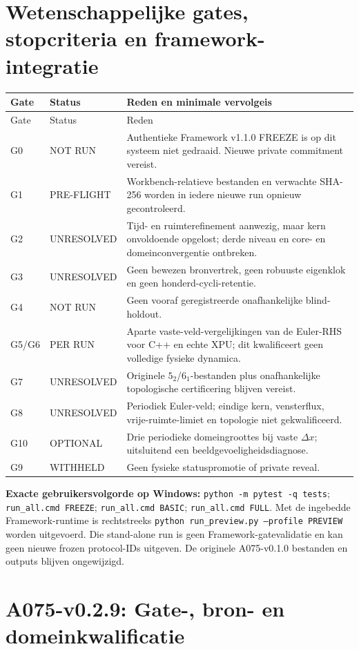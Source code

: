 \documentclass[10pt,a4paper]{article}
\begin{document}
\section{Wetenschappelijke gates, stopcriteria en framework-integratie}
\begin{longtable}{@{}p{12mm}p{25mm}p{109mm}@{}}\toprule
Gate & Status & Reden en minimale vervolgeis\\\midrule\endfirsthead\toprule Gate & Status & Reden\\\midrule\endhead
G0 & NOT RUN & Authentieke Framework v1.1.0 FREEZE is op dit systeem niet gedraaid. Nieuwe private commitment vereist.\\
G1 & PRE-FLIGHT & Workbench-relatieve bestanden en verwachte SHA-256 worden in iedere nieuwe run opnieuw gecontroleerd.\\
G2 & UNRESOLVED & Tijd- en ruimterefinement aanwezig, maar kern onvoldoende opgelost; derde niveau en core- en domeinconvergentie ontbreken.\\
G3 & UNRESOLVED & Geen bewezen bronvertrek, geen robuuste eigenklok en geen honderd-cycli-retentie.\\
G4 & NOT RUN & Geen vooraf geregistreerde onafhankelijke blind-holdout.\\
G5/G6 & PER RUN & Aparte vaste-veld-vergelijkingen van de Euler-RHS voor C++ en echte XPU; dit kwalificeert geen volledige fysieke dynamica.\\
G7 & UNRESOLVED & Originele $5_2$/$6_1$-bestanden plus onafhankelijke topologische certificering blijven vereist.\\
G8 & UNRESOLVED & Periodiek Euler-veld; eindige kern, vensterflux, vrije-ruimte-limiet en topologie niet gekwalificeerd.\\
G10 & OPTIONAL & Drie periodieke domeingroottes bij vaste $\Delta x$; uitsluitend een beeldgevoeligheidsdiagnose.\\
G9 & WITHHELD & Geen fysieke statuspromotie of private reveal.\\\bottomrule\end{longtable}
\noindent\textbf{Exacte gebruikersvolgorde op Windows:} \texttt{python -m pytest -q tests}; \texttt{run\_all.cmd FREEZE}; \texttt{run\_all.cmd BASIC}; \texttt{run\_all.cmd FULL}. Met de ingebedde Framework-runtime is rechtstreeks \texttt{python run\_preview.py --profile PREVIEW} worden uitgevoerd. Die stand-alone run is geen Framework-gatevalidatie en kan geen nieuwe frozen protocol-IDs uitgeven. De originele A075-v0.1.0 bestanden en outputs blijven ongewijzigd.
\section{A075-v0.2.9: Gate-, bron- en domeinkwalificatie}
\end{document}
